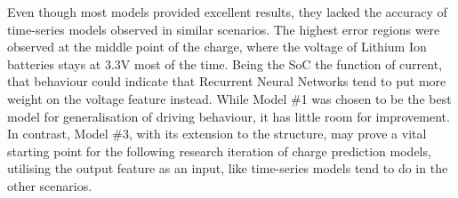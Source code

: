 %
%
Even though most models provided excellent results, they lacked the accuracy of time-series models observed in similar scenarios.
The highest error regions were observed at the middle point of the charge, where the voltage of Lithium Ion batteries stays at 3.3V most of the time.
Being the SoC the function of current, that behaviour could indicate that Recurrent Neural Networks tend to put more weight on the voltage feature instead.
While Model \#1 was chosen to be the best model for generalisation of driving behaviour, it has little room for improvement.
In contrast, Model \#3, with its extension to the structure, may prove a vital starting point for the following research iteration of charge prediction models, utilising the output feature as an input, like time-series models tend to do in the other scenarios.
